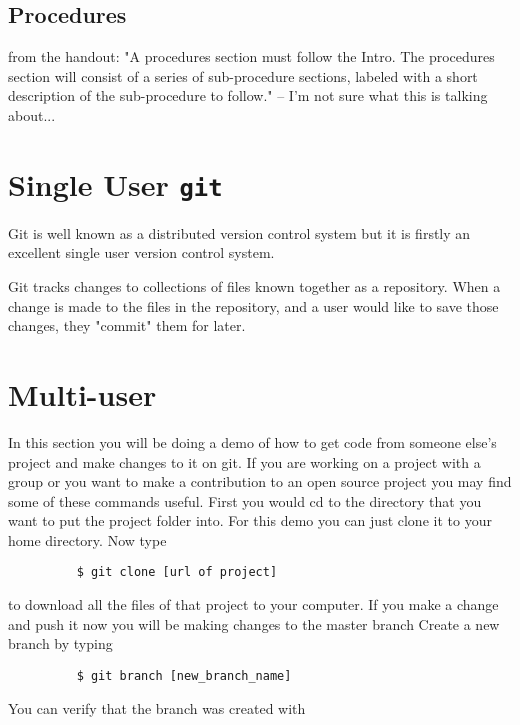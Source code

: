 \documentclass[11pt]{report}
\begin{document}
\section{Procedures}
from the handout: "A procedures section must follow the Intro. The
procedures section will consist of a series of sub-procedure sections,
labeled with a short description of the sub-procedure to follow." --
I'm not sure what this is talking about...

\chapter{Single User \texttt{git}}
Git is well known as a distributed version control system but it is
firstly an excellent single user version control system.

Git tracks changes to collections of files known together as a repository.
When a change is made to the files in the repository, and a user would like
to save those changes, they "commit" them for later.


\chapter{Multi-user}
In this section you will be doing a demo of how to get code from
someone else's project and make changes to it on git. If you are
working on a project with a group or you want to make a contribution
to an open source project you may find some of these commands useful.
First you would cd to the directory that you want to put the project
folder into.  For this demo you can just clone it to your home
directory.  Now type

\begin{figure}[H]
  \begin{lstlisting}
    $ git clone [url of project]
  \end{lstlisting}
\end{figure}


to download all the files of that project to your computer.  If you
make a change and push it now you will be making changes to the master
branch Create a new branch by typing

\begin{figure}[H]
  \begin{lstlisting}
    $ git branch [new_branch_name]
  \end{lstlisting}
\end{figure}

You can verify that the branch was created with
\end{document}
